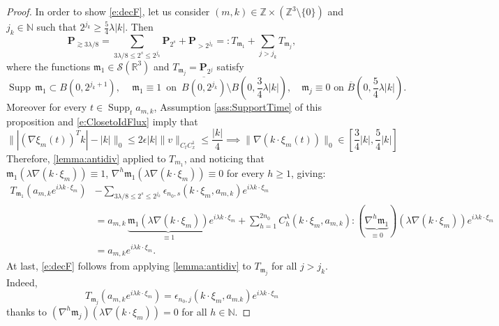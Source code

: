 \documentclass[10pt,a4paper]{amsart}
\numberwithin{equation}{section}
\numberwithin{corollario}{section}
\numberwithin{lemma}{section}
\numberwithin{prop}{section}
\theoremstyle{definition}
\theoremstyle{remark}
\newcommand{\N}{\mathbb{N}}
\newcommand{\Z}{\mathbb{Z}}
\newcommand{\R}{\mathbb{R}}
\newcommand{\proj}{\mathbf{P}}
\DeclareMathOperator{\supp}{Supp}
\begin{document}
\begin{proof}
In order to show \eqref{e:decF}, let us consider $(m,k)\in \Z\times(\Z^3 \setminus \{0\})$ and $j_k \in \N$ such that $2^{j_k}\geq \frac54\lambda|k|$. Then 
\begin{equation}
 \proj_{\gtrsim3\lambda/8}
 =
 \sum_{3\lambda/8\le2^s\le 2^{j_k}}\proj_{2^s}+\proj_{>2^{j_k}}=:T_{\mathfrak{m}_1}+\sum_{j>j_k}T_{\mathfrak{m}_j},   
\end{equation}
where the functions $\mathfrak{m}_1\in \mathcal{S}(\R^3)$ and $T_{\mathfrak{m}_j}=\proj_{2^j}$ satisfy
\begin{equation}
  \supp \,\mathfrak{m}_1\subset B(0,2^{j_k+1}),
  \, \quad 
  \mathfrak{m}_1\equiv 1 \,\text{ on  }\,\overline{B(0,2^{j_k})}\setminus B\left(0,\frac{3}{4}\lambda |k|\right),
  \quad 
  \mathfrak{m}_j\equiv 0 \text{ on }\overline{B}\left(0,\frac{5}{4}\lambda |k|\right).  
\end{equation}
Moreover for every $t\in \supp_t a_{m,k}$, Assumption \ref{ass:SupportTime} of this proposition and \eqref{e:ClosetoIdFlux} imply that
\begin{equation}
    \|| (\nabla \xi_m(t))^Tk|-|k|\|_0\le 2\epsilon|k|\|v\|_{C_tC_x^1}\le \frac{|k|}{4}\implies \|\nabla(k\cdot  \xi_m(t))\|_0 \in \left[\frac34|k|,\frac54|k|\right]
\end{equation}
Therefore,  \autoref{lemma:antidiv} applied to $T_{m_1}$, and noticing that $\mathfrak{m}_1(\lambda\nabla(k\cdot\xi_m)) \equiv 1$, $\nabla^h \mathfrak{m}_1(\lambda\nabla(k\cdot\xi_m)) \equiv 0$ for every $h \geq 1$, giving:
\begin{align}
    T_{\mathfrak{m}_1}(a_{m,k}e^{i\lambda k\cdot \xi_m})
    &-\sum_{3\lambda/8\le 2^s\le 2^{j_k}}
    \mathcal{\epsilon}_{n_0,s}(k \cdot\xi_m,a_{m,k}) 
    e^{i\lambda k \cdot\xi_m}
    \\
    &=
    a_{m,k}\,\underbrace{\mathfrak{m}_1(\lambda\nabla(k\cdot\xi_m))}_{\equiv1}
    e^{i\lambda k \cdot\xi_m}
    +
    \sum_{h=1}^{2n_0}C_h^{\lambda}(k\cdot\xi_m,a_{m,k}):(\underbrace{\nabla^h \mathfrak{m}_1}_{\equiv0})(\lambda\nabla(k\cdot\xi_m))
    e^{i\lambda k \cdot\xi_m}
    \\
    &=
    a_{m,k}     e^{i\lambda k \cdot\xi_m}.
\end{align}
At last, \eqref{e:decF} follows from applying \autoref{lemma:antidiv} to $T_{\mathfrak{m}_j}$ for all $j>j_k$. Indeed, 
\[T_{\mathfrak{m}_j}(a_{m,k}e^{i\lambda k\cdot \xi_m})=\epsilon_{n_0,j}(k\cdot \xi_m,a_{m.k})e^{i\lambda k\cdot \xi_m}\]
thanks to $(\nabla^h\mathfrak{m}_j)(\lambda \nabla(k\cdot\xi_m))=0$ for all $h\in \N$.


\end{proof}
\end{document}
